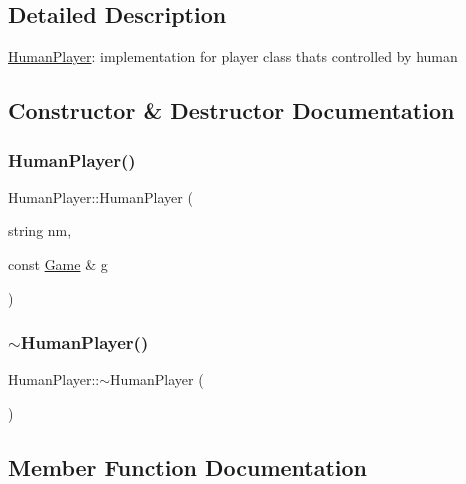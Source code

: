 \subsection{Detailed Description}
\mbox{\hyperlink{class_human_player}{Human\+Player}}\+: implementation for player class that\textquotesingle{}s controlled by human 

\subsection{Constructor \& Destructor Documentation}
\mbox{\label{class_human_player_a70910b8414dda741db2e2f08e048cfe4}} 
\subsubsection{\texorpdfstring{Human\+Player()}{HumanPlayer()}}
{\footnotesize\ttfamily Human\+Player\+::\+Human\+Player (\begin{DoxyParamCaption}\item[{string}]{nm,  }\item[{const \mbox{\hyperlink{class_game}{Game}} \&}]{g }\end{DoxyParamCaption})\hspace{0.3cm}{\ttfamily [inline]}}

\mbox{\label{class_human_player_abdeb9d120fc74c8d82ec0c688883f16f}} 
\subsubsection{\texorpdfstring{$\sim$\+Human\+Player()}{~HumanPlayer()}}
{\footnotesize\ttfamily Human\+Player\+::$\sim$\+Human\+Player (\begin{DoxyParamCaption}{ }\end{DoxyParamCaption})\hspace{0.3cm}{\ttfamily [inline]}}



\subsection{Member Function Documentation}
\mbox{\label{class_human_player_acecbe621447504a013c2a763aaba05fa}} 
